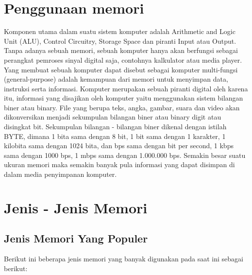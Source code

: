\section{Penggunaan memori}
Komponen utama dalam suatu sistem komputer adalah Arithmetic and Logic Unit (ALU), Control Circuitry, Storage Space dan piranti Input atau Output. Tanpa adanya sebuah memori, sebuah komputer hanya akan berfungsi sebagai perangkat pemroses sinyal digital saja, contohnya kalkulator atau media player. Yang membuat sebuah komputer dapat disebut sebagai komputer multi-fungsi (general-purpose)  adalah kemampuan  dari memori untuk menyimpan data, instruksi serta informasi. Komputer merupakan sebuah piranti digital oleh karena itu, informasi yang disajikan oleh komputer yaitu menggunakan sistem bilangan biner atau binary. File yang berupa teks, angka, gambar, suara dan video akan dikonversikan menjadi sekumpulan bilangan biner atau binary digit atau disingkat bit. Sekumpulan bilangan - bilangan biner dikenal dengan istilah BYTE, dimana  1 bita sama dengan 8 bit, 1 bit sama dengan 1 karakter, 1 kilobita sama dengan 1024 bita, dan bps sama dengan bit per second, 1 kbps sama dengan 1000 bps, 1 mbps sama dengan 1.000.000 bps. Semakin besar suatu ukuran memori maka semakin banyak pula informasi yang dapat disimpan di dalam media penyimpanan komputer.

\section{Jenis - Jenis Memori}

\subsection{Jenis Memori Yang Populer}

Berikut ini beberapa jenis memori yang banyak digunakan pada saat ini sebagai berikut:

